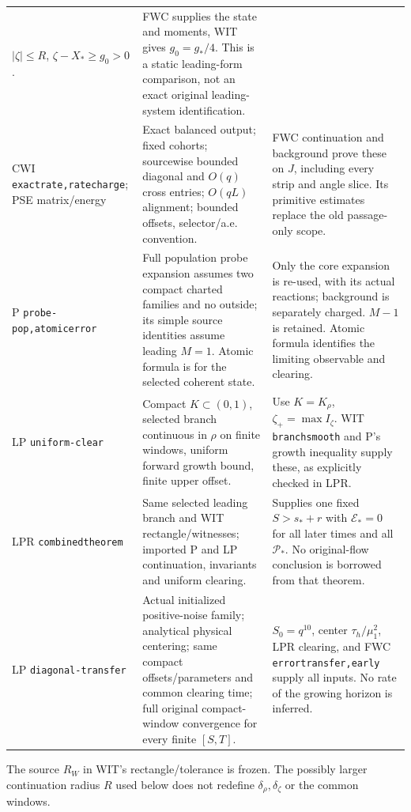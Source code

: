 \documentclass[11pt]{article}
\numberwithin{equation}{section}
\begin{document}
\begin{longtable}{>{\raggedright\arraybackslash}p{}
 >{\raggedright\arraybackslash}p{}
 >{\raggedright\arraybackslash}p{}}
 \(|\zeta|\le R\), \(\zeta-X_*\ge g_0>0\).
& FWC supplies the state and moments, WIT gives \(g_0=g_*/4\).
 This is a static leading-form comparison, not an exact original
 leading-system identification.\\
CWI \texttt{exactrate,\allowbreak ratecharge}; PSE matrix/energy
& Exact balanced output; fixed cohorts; sourcewise bounded
 diagonal and \(O(q)\) cross entries; \(O(qL)\) alignment;
 bounded offsets, selector/a.e. convention.
& FWC continuation and background prove these on \(J\), including
 every strip and angle slice. Its primitive estimates replace the
 old passage-only scope.\\
P \texttt{probe-pop,\allowbreak atomicerror}
& Full population probe expansion assumes two compact charted
 families and no outside; its simple source identities assume
 leading \(M=1\). Atomic formula is for the selected coherent state.
& Only the core expansion is re-used, with its actual reactions;
 background is separately charged. \(M-1\) is retained. Atomic
 formula identifies the limiting observable and clearing.\\
LP \texttt{uniform-clear}
& Compact \(K\subset(0,1)\), selected branch continuous in \(\rho\)
 on finite windows, uniform forward growth bound, finite upper offset.
& Use \(K=K_\rho\), \(\zeta_+=\max I_\zeta\). WIT
 \texttt{branchsmooth} and P's growth inequality supply these,
 as explicitly checked in LPR.\\
LPR \texttt{combinedtheorem}
& Same selected leading branch and WIT rectangle/witnesses;
 imported P and LP continuation, invariants and uniform clearing.
& Supplies one fixed \(S>s_*+r\) with \(\mathcal E_*=0\) for
 all later times and all \(\mathcal P_*\). No original-flow
 conclusion is borrowed from that theorem.\\
LP \texttt{diagonal-transfer}
& Actual initialized positive-noise family; analytical physical
 centering; same compact offsets/parameters and common clearing
 time; full original compact-window convergence for every finite
 \([S,T]\).
& \(S_0=q^{10}\), center \(\tau_h/\mu_1^2\), LPR clearing,
 and FWC \texttt{errortransfer,\allowbreak early} supply all inputs. No rate
 of the growing horizon is inferred.\\
\bottomrule
\end{longtable}\normalsize
The source \(R_W\) in WIT's rectangle/tolerance is frozen.
The possibly larger continuation radius \(R\) used below does not
redefine \(\delta_\rho,\delta_\zeta\) or the common windows.
\end{document}
